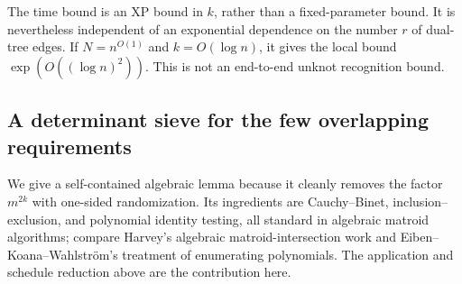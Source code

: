 The time bound is an XP bound in $k$, rather than a fixed-parameter bound.
It is nevertheless independent of an exponential dependence on the number
$r$ of dual-tree edges.  If $N=n^{O(1)}$ and $k=O(\log n)$, it gives the
local bound $\exp(O((\log n)^2))$.  This is not an end-to-end unknot
recognition bound.

\subsection{A determinant sieve for the few overlapping requirements}

We give a self-contained algebraic lemma because it cleanly removes the
factor $m^{2k}$ with one-sided randomization.  Its ingredients are Cauchy--Binet,
inclusion--exclusion, and polynomial identity testing, all standard in
algebraic matroid algorithms; compare Harvey's algebraic matroid-intersection
work and Eiben--Koana--Wahlstr\"om's treatment of enumerating polynomials.
The application and schedule reduction above are the contribution here.

